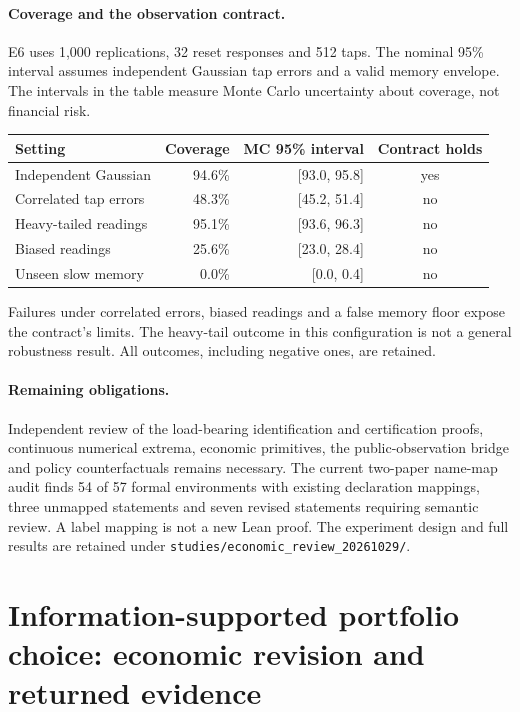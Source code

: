 \documentclass[12pt]{article}
\theoremstyle{definition}
\theoremstyle{remark}
\begin{document}
\paragraph{Coverage and the observation contract.} E6 uses 1,000 replications,
32 reset responses and 512 taps. The nominal 95\% interval assumes independent
Gaussian tap errors and a valid memory envelope. The intervals in the table
measure Monte Carlo uncertainty about coverage, not financial risk.
\begin{center}\small
\begin{tabular}{lrrc}
\toprule
Setting & Coverage & MC 95\% interval & Contract holds\\
\midrule
Independent Gaussian & 94.6\% & [93.0, 95.8] & yes\\
Correlated tap errors & 48.3\% & [45.2, 51.4] & no\\
Heavy-tailed readings & 95.1\% & [93.6, 96.3] & no\\
Biased readings & 25.6\% & [23.0, 28.4] & no\\
Unseen slow memory & 0.0\% & [0.0, 0.4] & no\\
\bottomrule
\end{tabular}
\end{center}
Failures under correlated errors, biased readings and a false memory floor expose
the contract's limits. The heavy-tail outcome in this configuration is not a
general robustness result. All outcomes, including negative ones, are retained.

\paragraph{Remaining obligations.} Independent review of the load-bearing
identification and certification proofs, continuous numerical extrema, economic
primitives, the public-observation bridge and policy counterfactuals remains
necessary. The current two-paper name-map audit finds 54 of 57 formal environments
with existing declaration mappings, three unmapped statements and seven revised
statements requiring semantic review. A label mapping is not a new Lean proof.
The experiment design and full results are retained under
\texttt{studies/economic\_review\_20261029/}.


\section*{Information-supported portfolio choice: economic revision and returned evidence}
\end{document}
